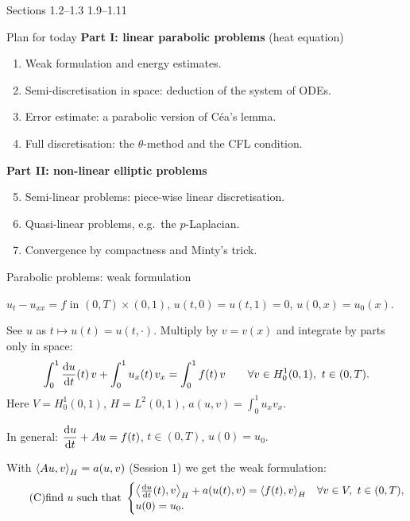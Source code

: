 
{Sections 1.2--1.3}
{}
{1.9--1.11}

\begin{frame}{Plan for today}
  \textbf{Part I: linear parabolic problems} (heat equation)
  \begin{enumerate}
    \item Weak formulation and energy estimates.
    \item Semi-discretisation in space: deduction of the system of ODEs.
    \item Error estimate: a parabolic version of Céa's lemma.
    \item Full discretisation: the $\theta$-method and the CFL condition.
  \end{enumerate}
  \medskip
  \textbf{Part II: non-linear elliptic problems}
  \begin{enumerate}
    \setcounter{enumi}{4}
    \item Semi-linear problems: piece-wise linear discretisation.
    \item Quasi-linear problems, e.g.\ the $p$-Laplacian.
    \item Convergence by compactness and Minty's trick.
  \end{enumerate}
\end{frame}

\begin{frame}{Parabolic problems: weak formulation}
  \begin{example}
    $u_t - u_{xx} = f$ in $(0,T) \times (0,1)$, \quad $u(t,0) = u(t,1) = 0$, \quad $u(0,x) = u_0(x)$.
    \smallskip

    See $u$ as $t \mapsto u(t) = u(t,\cdot)$. Multiply by $v = v(x)$ and integrate by parts \alert{only in space}:
    \[
      \int_0^1 \frac{{\mathrm d} u}{{\mathrm d} t}(t)\, v + \int_0^1 u_x(t)\, v_x = \int_0^1 f(t)\, v
      \qquad \forall v \in H^1_0(0,1),\ t \in (0,T).
    \]
    Here $V = H^1_0(0,1)$, $H = L^2(0,1)$, $a(u,v) = \int_0^1 u_x v_x$.
  \end{example}
  In general: \quad $\dfrac{{\mathrm d} u}{{\mathrm d} t} + Au = f(t)$, \quad $t \in (0,T)$, \quad $u(0) = u_0$.

  With $\left\langle Au, v \right\rangle_H = a(u,v)$ (Session 1) we get the weak formulation:
  \[
    \tag{C}
    \text{find } u \text{ such that }
    \begin{cases}
      \left\langle \frac{{\mathrm d} u}{{\mathrm d} t}(t), v \right\rangle_H + a(u(t), v) = \left\langle f(t), v \right\rangle_H & \forall v \in V,\ t \in (0,T), \\
      u(0) = u_0.
    \end{cases}
  \]
\end{frame}

